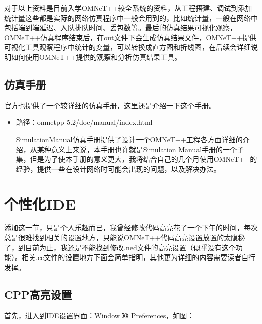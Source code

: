 对于以上资料是目前入学OMNeT++较全系统的资料，从工程搭建、调试到添加统计量这些都是实际的网络仿真程序中一般会用到的，比如统计量，一般在网络中包括端到端延迟、入队排队时间、丢包数等。最后的仿真结果可视化观察，OMNeT++仿真程序结束后，在out文件下会生成仿真结果文件，OMNeT++提供可视化工具观察程序中统计的变量，可以转换成直方图和折线图，在后续会详细说明如何使用OMNeT++提供的观察和分析仿真结果工具。\\

\subsection{仿真手册}
官方也提供了一个较详细的仿真手册，这里还是介绍一下这个手册。\\

\begin{itemize}
\item 路径：omnetpp-5.2/doc/manual/index.html

SimulationManual仿真手册提供了设计一个OMNeT++工程各方面详细的介绍，从某种意义上来说，本手册也许就是Simulation Manual手册的一个子集，但是为了使本手册的意义更大，我将结合自己的几个月使用OMNeT++的经验，提供一些在设计网络时可能会出现的问题，以及解决办法。\\
\end{itemize}

\section{个性化IDE}

添加这一节，只是个人乐趣而已，我曾经修改代码高亮花了一个下午的时间，每次总是很难找到相关的设置地方，只能说OMNeT++代码高亮设置放置的太隐秘了，到目前为止，我还是不能找到修改.ned文件的高亮设置（似乎没有这个功能）。相关.cc文件的设置地方下面会简单指明，其他更为详细的内容需要读者自行发挥。\\
\subsection{CPP高亮设置}

首先，进入到IDE设置界面：Window 》》  Preferences，如图：


